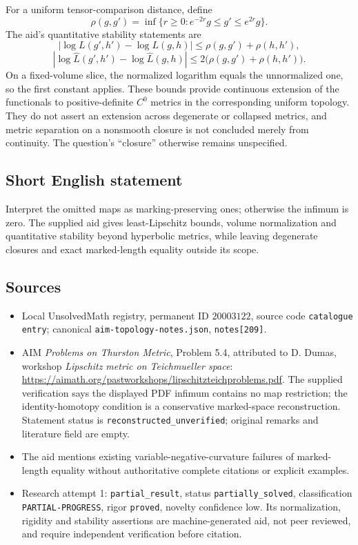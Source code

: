\documentclass[11pt]{article}
\begin{document}
For a uniform tensor-comparison distance, define
\[
\rho(g,g')=\inf\{r\geq0:e^{-2r}g\leq g'\leq e^{2r}g\}.
\]
The aid's quantitative stability statements are
\[
|\log L(g',h')-\log L(g,h)|\leq\rho(g,g')+\rho(h,h'),
\]
\[
|\log\widehat L(g',h')-\log\widehat L(g,h)|
\leq2\bigl(\rho(g,g')+\rho(h,h')\bigr).
\]
On a fixed-volume slice, the normalized logarithm equals the unnormalized one, so the first constant applies. These bounds provide continuous extension of the functionals to positive-definite $C^0$ metrics in the corresponding uniform topology. They do not assert an extension across degenerate or collapsed metrics, and metric separation on a nonsmooth closure is not concluded merely from continuity. The question's ``closure'' otherwise remains unspecified.
\subsection{Short English statement}
Interpret the omitted maps as marking-preserving ones; otherwise the infimum is zero. The supplied aid gives least-Lipschitz bounds, volume normalization and quantitative stability beyond hyperbolic metrics, while leaving degenerate closures and exact marked-length equality outside its scope.
\subsection{Sources}
\begin{itemize}
\item Local UnsolvedMath registry, permanent ID $20003122$, source code \texttt{catalogue entry}; canonical \texttt{aim-topology-notes.json}, \texttt{notes[209]}.
\item AIM \emph{Problems on Thurston Metric}, Problem 5.4, attributed to D. Dumas, workshop \emph{Lipschitz metric on Teichmueller space}: \url{https://aimath.org/pastworkshops/lipschitzteichproblems.pdf}. The supplied verification says the displayed PDF infimum contains no map restriction; the identity-homotopy condition is a conservative marked-space reconstruction. Statement status is \texttt{reconstructed\_unverified}; original remarks and literature field are empty.
\item The aid mentions existing variable-negative-curvature failures of marked-length equality without authoritative complete citations or explicit examples.
\item Research attempt 1: \texttt{partial\_result}, status \texttt{partially\_solved}, classification \texttt{PARTIAL-PROGRESS}, rigor \texttt{proved}, novelty confidence low. Its normalization, rigidity and stability assertions are machine-generated aid, not peer reviewed, and require independent verification before citation.
\end{itemize}
\end{document}
